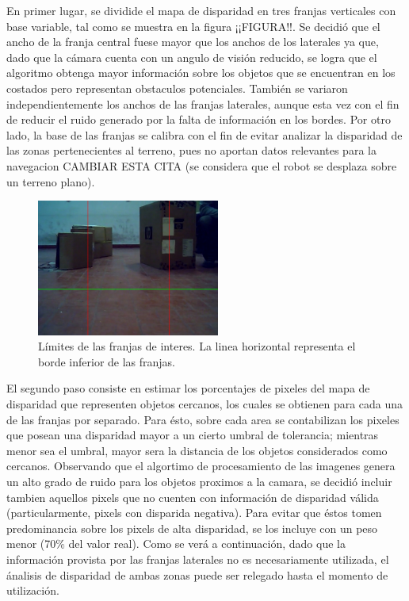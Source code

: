 \documentclass[journal]{IEEEtran}
\begin{document}
En primer lugar, se dividide el mapa de disparidad en tres franjas verticales con base variable, tal como se muestra en la figura ¡¡FIGURA!!. Se decidi\'o que el ancho de la franja central fuese mayor que los anchos de los laterales ya que, dado que la c\'amara cuenta con un angulo de visi\'on reducido, se logra que el algoritmo obtenga mayor informaci\'on sobre los objetos que se encuentran en los costados pero representan obstaculos potenciales. Tambi\'en se variaron independientemente los anchos de las franjas laterales, aunque esta vez con el fin de reducir el ruido generado por la falta de informaci\'on en los bordes. Por otro lado, la base de las franjas se calibra con el fin de evitar analizar la disparidad de las zonas pertenecientes al terreno, pues no aportan datos relevantes para la navegacion \cite{KNG10} CAMBIAR ESTA CITA (se considera que el robot se desplaza sobre un terreno plano). 

\begin{figure}[ht]
	\begin{center}
		\includegraphics[width=6cm]{./images/divisionPantalla.jpg}
		\caption{L\'imites de las franjas de interes. La linea horizontal representa el borde inferior de las franjas.}
	\end{center}
\end{figure}

El segundo paso consiste en estimar los porcentajes de pixeles del mapa de disparidad que representen objetos cercanos, los cuales se obtienen para cada una de las franjas por separado. Para \'esto, sobre cada area se contabilizan los pixeles que posean una disparidad mayor a un cierto umbral de tolerancia; mientras menor sea el umbral, mayor sera la distancia de los objetos considerados como cercanos. Observando que el algortimo de procesamiento de las imagenes genera un alto grado de ruido para los objetos proximos a la camara, se decidi\'o incluir tambien aquellos pixels que no cuenten con informaci\'on de disparidad v\'alida (particularmente, pixels con disparida negativa). Para evitar que \'estos tomen predominancia sobre los pixels de alta disparidad, se los incluye con un peso menor (70\% del valor real). Como se ver\'a a continuaci\'on, dado que la informaci\'on provista por las franjas laterales no es necesariamente utilizada, el \'analisis de disparidad de ambas zonas puede ser relegado hasta el momento de utilizaci\'on.
\end{document}

